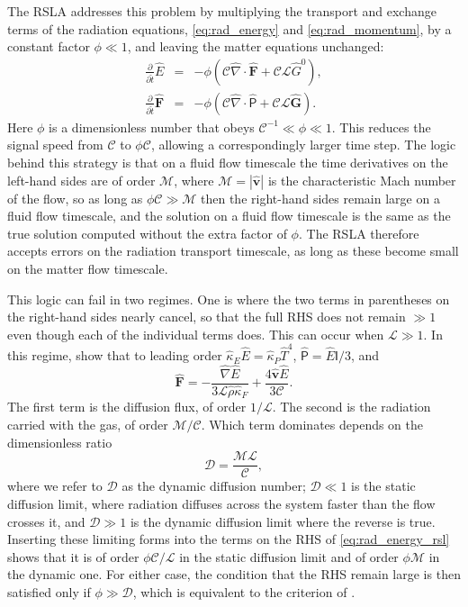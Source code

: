 \documentclass[preprint,12pt,authoryear]{elsarticle}
\newcommand{\tenI}{\mathsf{I}}
\newcommand{\hatt}{\hat{t}}
\newcommand{\hrho}{\hat{\rho}}
\newcommand{\hE}{\hat{E}}
\newcommand{\hnabla}{\hat{\nabla}}
\newcommand{\hT}{\hat{T}}
\newcommand{\hvecv}{\hat{\mathbf{v}}}
\newcommand{\hvecF}{\hat{\mathbf{F}}}
\newcommand{\hvecG}{\hat{\mathbf{G}}}
\newcommand{\htenP}{\hat{\mathsf{P}}}
\newcommand{\calC}{\mathcal{C}}
\newcommand{\calM}{\mathcal{M}}
\newcommand{\calL}{\mathcal{L}}
\newcommand{\calD}{\mathcal{D}}
\begin{document}
The RSLA addresses this problem by multiplying the transport and exchange terms of the radiation equations, \autoref{eq:rad_energy} and \autoref{eq:rad_momentum}, by a constant factor $\phi \ll 1$, and leaving the matter equations unchanged:
\begin{eqnarray}
\frac{\partial}{\partial\hatt} \hE & = & -\phi\left(\calC\hnabla\cdot\hvecF + \calC\calL\hat{G}^0\right),
\label{eq:rad_energy_rsl}
\\
\frac{\partial}{\partial \hatt}\hvecF & = & -\phi\left(\calC\hnabla\cdot\htenP + \calC\calL\hvecG \right).
\label{eq:rad_momentum_rsl}
\end{eqnarray}
Here $\phi$ is a dimensionless number that obeys $\calC^{-1} \ll \phi \ll 1$. This reduces the signal speed from $\calC$ to $\phi\calC$, allowing a correspondingly larger time step. The logic behind this strategy is that on a fluid flow timescale the time derivatives on the left-hand sides are of order $\calM$, where $\calM = |\hvecv|$ is the characteristic Mach number of the flow, so as long as $\phi\calC \gg \calM$ then the right-hand sides remain large on a fluid flow timescale, and the solution on a fluid flow timescale is the same as the true solution computed without the extra factor of $\phi$. The RSLA therefore accepts errors on the radiation transport timescale, as long as these become small on the matter flow timescale.

This logic can fail in two regimes. One is where the two terms in parentheses on the right-hand sides nearly cancel, so that the full RHS does not remain $\gg 1$ even though each of the individual terms does. This can occur when $\calL \gg 1$. In this regime, \citet{Lowrie99a} show that to leading order $\hat{\kappa}_E\hE = \hat{\kappa}_P\hT^4$, $\htenP = \hE\tenI/3$, and
\begin{equation}
    \hvecF = -\frac{\hnabla\hE}{3\calL\hrho\hat{\kappa}_F} + \frac{4\hvecv\hE}{3\calC} .
    \label{eq:flux_next_order}
\end{equation}
The first term is the diffusion flux, of order $1/\calL$. The second is the radiation carried with the gas, of order $\calM/\calC$. Which term dominates depends on the dimensionless ratio
\begin{equation}
    \calD = \frac{\calM\calL}{\calC},
\end{equation}
where we refer to $\calD$ as the dynamic diffusion number; $\calD \ll 1$ is the static diffusion limit, where radiation diffuses across the system faster than the flow crosses it, and $\calD \gg 1$ is the dynamic diffusion limit where the reverse is true. Inserting these limiting forms into the terms on the RHS of \autoref{eq:rad_energy_rsl} shows that it is of order $\phi\calC/\calL$ in the static diffusion limit and of order $\phi\calM$ in the dynamic one. For either case, the condition that the RHS remain large is then satisfied only if $\phi \gg \calD$, which is equivalent to the criterion of \citet{Skinner13a}.
\end{document}
